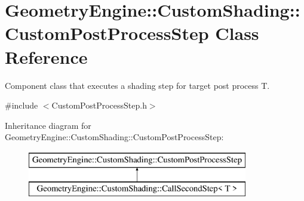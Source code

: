 \hypertarget{class_geometry_engine_1_1_custom_shading_1_1_custom_post_process_step}{}\section{Geometry\+Engine\+::Custom\+Shading\+::Custom\+Post\+Process\+Step Class Reference}
\label{class_geometry_engine_1_1_custom_shading_1_1_custom_post_process_step}


Component class that executes a shading step for target post process T.  




{\ttfamily \#include $<$Custom\+Post\+Process\+Step.\+h$>$}

Inheritance diagram for Geometry\+Engine\+::Custom\+Shading\+::Custom\+Post\+Process\+Step\+:\begin{figure}[H]
\begin{center}
\leavevmode
\includegraphics[height=2.000000cm]{class_geometry_engine_1_1_custom_shading_1_1_custom_post_process_step}
\end{center}
\end{figure}
